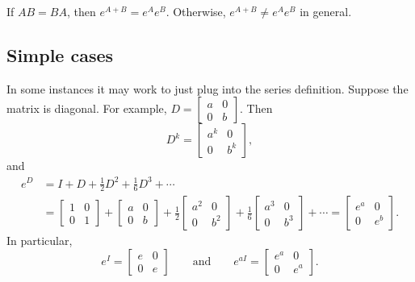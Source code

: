\begin{theorem}
If $AB = BA$, then $e^{A+B} = e^Ae^B$.  Otherwise,
$e^{A+B} \neq e^Ae^B$ in general.
\end{theorem}

\subsection{Simple cases}

In some instances it may work to just plug into the series definition.
Suppose the matrix is diagonal.
For example,
$D = \left[ \begin{smallmatrix} a & 0 \\ 0 & b \end{smallmatrix} \right]$.
Then 
\begin{equation*}
D^k = \begin{bmatrix} a^k & 0 \\ 0 & b^k \end{bmatrix} ,
\end{equation*}
and
\begin{equation*}
\begin{split}
e^D & =
I + D + \frac{1}{2} D^2 + 
\frac{1}{6} D^3 + \cdots
\\
&=
\begin{bmatrix} 1 & 0 \\ 0 & 1 \end{bmatrix} +
\begin{bmatrix} a & 0 \\ 0 & b \end{bmatrix} +
\frac{1}{2}
\begin{bmatrix} a^2 & 0 \\ 0 & b^2 \end{bmatrix} +
\frac{1}{6}
\begin{bmatrix} a^3 & 0 \\ 0 & b^3 \end{bmatrix} + \cdots
=
\begin{bmatrix} e^a & 0 \\ 0 & e^b \end{bmatrix} .
\end{split}
\end{equation*}
In particular,
\begin{equation*}
e^I = \begin{bmatrix} e & 0\\ 0 & e \end{bmatrix}
\qquad \text{and} \qquad
e^{aI} = \begin{bmatrix} e^a & 0\\ 0 & e^a \end{bmatrix}.
\end{equation*}


